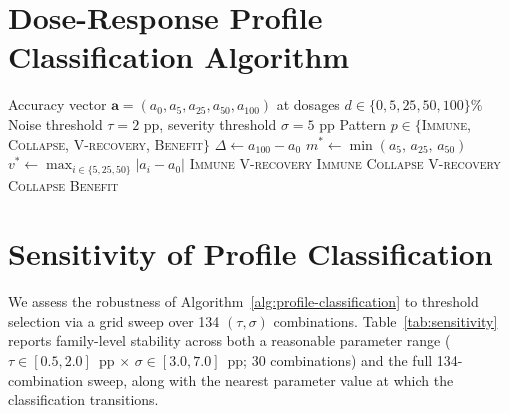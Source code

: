 \section{Dose-Response Profile Classification Algorithm}
\label{sec:classification_algorithm}

\begin{algorithm}[h]
\caption{Dose-Response Profile Classification}
\label{alg:profile-classification}
\begin{algorithmic}[1]
\Require Accuracy vector $\mathbf{a} = (a_{0}, a_{5}, a_{25}, a_{50}, a_{100})$ at dosages $d \in \{0, 5, 25, 50, 100\}\%$
\Require Noise threshold $\tau = 2$ pp, severity threshold $\sigma = 5$ pp
\Ensure Pattern $p \in \{$\textsc{Immune}, \textsc{Collapse},
\Statex \hspace{\algorithmicindent}\textsc{V-recovery}, \textsc{Benefit}$\}$
\State $\Delta \gets a_{100} - a_{0}$ 
\State $m^* \gets \min(a_{5},\, a_{25},\, a_{50})$ 
\State $v^* \gets \max_{i \in \{5,25,50\}} |a_i - a_0|$ 
\If{$|\Delta| \le \tau$}
        \State \Return \textsc{Immune} 
        \State \Return \textsc{V-recovery} 
    \Else
        \State \Return \textsc{Immune} 
    \EndIf
\ElsIf{$\Delta < -\tau$}
    \If{$\Delta \le -\sigma$}
        \State \Return \textsc{Collapse} 
        \State \Return \textsc{V-recovery} 
    \Else
        \State \Return \textsc{Collapse} 
    \EndIf
\Else \Comment{$\Delta > \tau$}
    \State \Return \textsc{Benefit} 
\EndIf
\end{algorithmic}
\end{algorithm}

\section{Sensitivity of Profile Classification}
\label{sec:classification_sensitivity}

We assess the robustness of Algorithm~\ref{alg:profile-classification} to threshold selection via a grid sweep over 134 $(\tau, \sigma)$ combinations. Table~\ref{tab:sensitivity} reports family-level stability across both a reasonable parameter range ($\tau \in [0.5, 2.0]$~pp $\times$ $\sigma \in [3.0, 7.0]$~pp; 30 combinations) and the full 134-combination sweep, along with the nearest parameter value at which the classification transitions.

